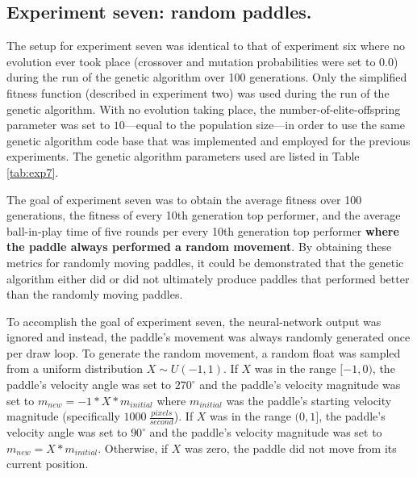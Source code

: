 \subsection[Experiment Seven]{Experiment seven: random paddles.} 


The setup for experiment seven was identical to that of experiment six where no evolution ever took place (crossover and mutation probabilities were set to $0.0$) during the run of the genetic algorithm over 100 generations. Only the simplified fitness function (described in experiment two) was used during the run of the genetic algorithm. With no evolution taking place, the number-of-elite-offspring parameter was set to $10$---equal to the population size---in order to use the same genetic algorithm code base that was implemented and employed for the previous experiments. The genetic algorithm parameters used are listed in Table \ref{tab:exp7}. 

The goal of experiment seven was to obtain the average fitness over 100 generations, the fitness of every 10th generation top performer, and the average ball-in-play time of five rounds per every 10th generation top performer \textbf{where the paddle always performed a random movement}. By obtaining these metrics for randomly moving paddles, it could be demonstrated that the genetic algorithm either did or did not ultimately produce paddles that performed better than the randomly moving paddles. 

To accomplish the goal of experiment seven, the neural-network output was ignored and instead, the paddle's movement was always randomly generated once per draw loop. To generate the random movement, a random float was sampled from a uniform distribution $X\sim U(-1,1)$. If $X$ was in the range $[-1,0)$, the paddle's velocity angle was set to $270^\circ$ and the paddle's velocity magnitude was set to $m_{new} = -1 * X * m_{initial}$ where $m_{initial}$ was the paddle's starting velocity magnitude (specifically $1000 \ \frac{pixels}{second}$). If $X$ was in the range $(0,1]$, the paddle's velocity angle was set to $90^\circ$ and the paddle's velocity magnitude was set to $m_{new} = X * m_{initial}$. Otherwise, if $X$ was zero, the paddle did not move from its current position. 


